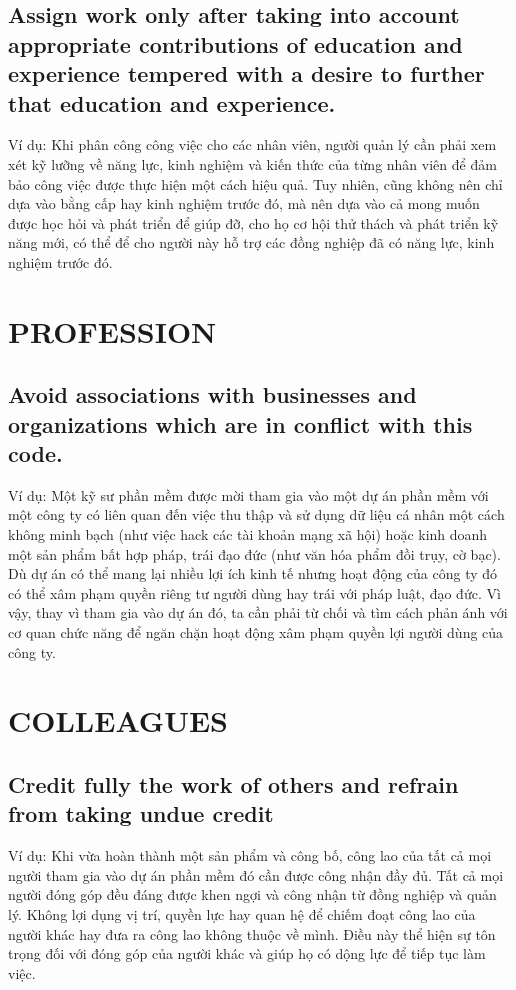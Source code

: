\documentclass[14pt]{extarticle}
\begin{document}
\subsection{Assign work only after taking into account appropriate 
contributions of education and experience tempered with a desire to 
further that education and experience.}
Ví dụ: Khi phân công công việc cho các nhân viên, người quản lý cần
phải xem xét kỹ lưỡng về năng lực, kinh nghiệm và kiến thức của từng
nhân viên để đảm bảo công việc được thực hiện một cách hiệu quả. Tuy
nhiên, cũng không nên chỉ dựa vào bằng cấp hay kinh nghiệm trước đó, 
mà nên dựa vào cả mong muốn được học hỏi và phát triển để giúp đỡ,
cho họ cơ hội thử thách và phát triển kỹ năng mới, có thể để cho người
này hỗ trợ các đồng nghiệp đã có năng lực, kinh nghiệm trước đó.

\section{PROFESSION}
\setcounter{subsection}{9}
\subsection{Avoid associations with businesses and organizations 
which are in conflict with this code.}
Ví dụ: Một kỹ sư phần mềm được mời tham gia vào một dự án phần mềm với 
một công ty có liên quan đến việc thu thập và sử dụng dữ liệu cá nhân 
một cách không minh bạch (như việc hack các tài khoản mạng xã hội) 
hoặc kinh doanh một sản phẩm bất hợp pháp, trái đạo đức (như văn hóa
phẩm đồi trụy, cờ bạc). Dù dự án có thể mang lại nhiều lợi ích kinh tế
nhưng hoạt động của công ty đó có thể xâm phạm quyền riêng tư người dùng
hay trái với pháp luật, đạo đức. Vì vậy, thay vì tham gia vào dự án đó, 
ta cần phải từ chối và tìm cách phản ánh với cơ quan chức năng để ngăn
chặn hoạt động xâm phạm quyền lợi người dùng của công ty.

\section{COLLEAGUES}
\setcounter{subsection}{2}
\subsection{Credit fully the work of others and refrain from taking undue credit}
Ví dụ: Khi vừa hoàn thành một sản phẩm và công bố, công lao của tất cả
mọi người tham gia vào dự án phần mềm đó cần được công nhận đầy đủ.
Tất cả mọi người đóng góp đều đáng được khen ngợi và công nhận
từ đồng nghiệp và quản lý. Không lợi dụng vị trí, quyền lực hay quan
hệ để chiếm đoạt công lao của người khác hay đưa ra công lao không
thuộc về mình. Điều này thể hiện sự tôn trọng đối với đóng góp của người khác
và giúp họ có dộng lực để tiếp tục làm việc.
\end{document}
